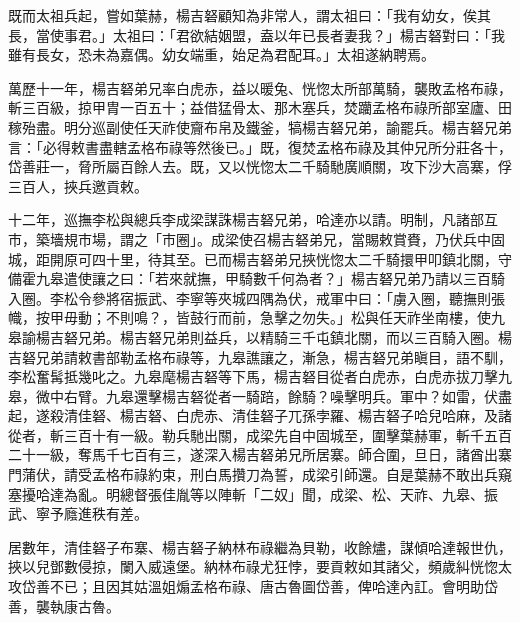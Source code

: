\begin{pinyinscope}
既而太祖兵起，嘗如葉赫，楊吉砮顧知為非常人，謂太祖曰：「我有幼女，俟其長，當使事君。」太祖曰：「君欲結姻盟，盍以年已長者妻我？」楊吉砮對曰：「我雖有長女，恐未為嘉偶。幼女端重，始足為君配耳。」太祖遂納聘焉。

萬歷十一年，楊吉砮弟兄率白虎赤，益以暖兔、恍惚太所部萬騎，襲敗孟格布祿，斬三百級，掠甲胄一百五十；益借猛骨太、那木塞兵，焚躪孟格布祿所部室廬、田稼殆盡。明分巡副使任天祚使齎布帛及鐵釜，犒楊吉砮兄弟，諭罷兵。楊吉砮兄弟言：「必得敕書盡轄孟格布祿等然後已。」既，復焚孟格布祿及其仲兄所分莊各十，岱善莊一，脅所屬百餘人去。既，又以恍惚太二千騎馳廣順關，攻下沙大高寨，俘三百人，挾兵邀貢敕。

十二年，巡撫李松與總兵李成梁謀誅楊吉砮兄弟，哈達亦以請。明制，凡諸部互市，築墻規市場，謂之「市圈」。成梁使召楊吉砮弟兄，當賜敕賞賚，乃伏兵中固城，距開原可四十里，待其至。已而楊吉砮弟兄挾恍惚太二千騎擐甲叩鎮北關，守備霍九皋遣使讓之曰：「若來就撫，甲騎數千何為者？」楊吉砮兄弟乃請以三百騎入圈。李松令參將宿振武、李寧等夾城四隅為伏，戒軍中曰：「虜入圈，聽撫則張幟，按甲毋動；不則鳴？，皆鼓行而前，急擊之勿失。」松與任天祚坐南樓，使九皋諭楊吉砮兄弟。楊吉砮兄弟則益兵，以精騎三千屯鎮北關，而以三百騎入圈。楊吉砮兄弟請敕書部勒孟格布祿等，九皋譙讓之，漸急，楊吉砮兄弟瞋目，語不馴，李松奮髯抵幾叱之。九皋麾楊吉砮等下馬，楊吉砮目從者白虎赤，白虎赤拔刀擊九皋，微中右臂。九皋還擊楊吉砮從者一騎踣，餘騎？噪擊明兵。軍中？如雷，伏盡起，遂殺清佳砮、楊吉砮、白虎赤、清佳砮子兀孫孛羅、楊吉砮子哈兒哈麻，及諸從者，斬三百十有一級。勒兵馳出關，成梁先自中固城至，圍擊葉赫軍，斬千五百二十一級，奪馬千七百有三，遂深入楊吉砮弟兄所居寨。師合圍，旦日，諸酋出寨門蒲伏，請受孟格布祿約束，刑白馬攢刀為誓，成梁引師還。自是葉赫不敢出兵窺塞擾哈達為亂。明總督張佳胤等以陣斬「二奴」聞，成梁、松、天祚、九皋、振武、寧予廕進秩有差。

居數年，清佳砮子布寨、楊吉砮子納林布祿繼為貝勒，收餘燼，謀傾哈達報世仇，挾以兒鄧數侵掠，闌入威遠堡。納林布祿尤狂悖，要貢敕如其諸父，頻歲糾恍惚太攻岱善不已；且因其姑溫姐煽孟格布祿、唐古魯圖岱善，俾哈達內訌。會明助岱善，襲執康古魯。


\end{pinyinscope}
